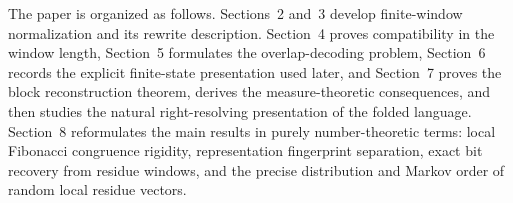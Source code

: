 The paper is organized as follows.  Sections~2 and~3 develop finite-window
normalization and its rewrite description.  Section~4 proves compatibility in
the window length, Section~5 formulates the overlap-decoding problem,
Section~6 records the explicit finite-state presentation used later, and
Section~7 proves the block reconstruction theorem, derives the measure-theoretic
consequences, and then studies the natural right-resolving presentation of the
folded language.  Section~8 reformulates the main results in purely
number-theoretic terms: local Fibonacci congruence rigidity, representation
fingerprint separation, exact bit recovery from residue windows, and the
precise distribution and Markov order of random local residue vectors.

